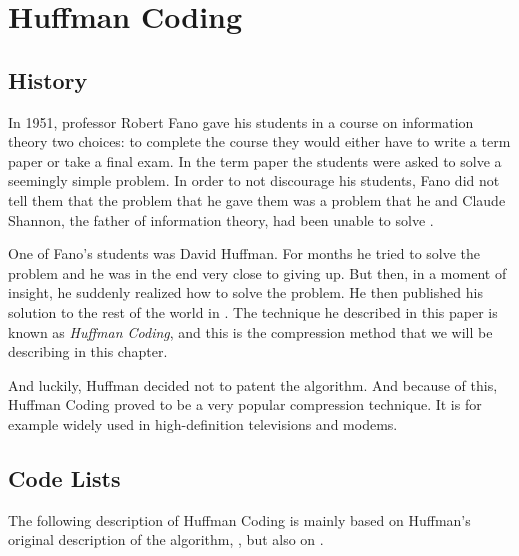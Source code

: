 \begin{comment}
  
\end{comment}


\chapter{Huffman Coding}
\label{cha:huffman}

\section{History}

In 1951, professor Robert Fano gave his students in a course on
information theory two choices: to complete the course they would
either have to write a term paper or take a final exam. In the term
paper the students were asked to solve a seemingly simple problem. In
order to not discourage his students, Fano did not tell them that the
problem that he gave them was a problem that he and Claude Shannon,
the father of information theory, had been unable to
solve \cite{stix91:_profil}.

One of Fano's students was David Huffman. For months he tried to solve
the problem and he was in the end very close to giving up. But then,
in a moment of insight, he suddenly realized how to solve the
problem. He then published his solution to the rest of the world in
\cite{huf52}. The technique he described in this paper is known as
\textit{Huffman Coding}, and this is the compression method that we
will be describing in this chapter.

And luckily, Huffman decided not to patent the algorithm. And because
of this, Huffman Coding proved to be a very popular compression
technique. It is for example widely used in high-definition
televisions and modems.

\section{Code Lists}

The following description of Huffman Coding is mainly based on
Huffman's original description of the algorithm, \cite{huf52}, but
also on
\cite{Salomon:2004:DCC,mark1996data_compression_book,mcfadden92:_hackin_data_compr,mahoney11:_data_compr_explain,Lelewer:1987:DC:45072.45074,cormen2009introduction_to_algo}.

